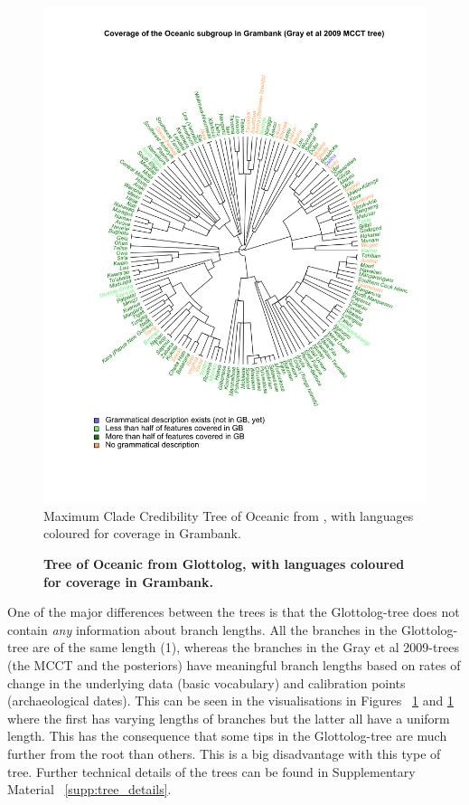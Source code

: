 \documentclass[draft,10pt]{article} %
\begin{document}
\begin{figure}[H]
\centering
\includegraphics[width=\textwidth]{illustrations/plots_from_R/coverage_plots/tree/Oceanic_tree_desc_status_gray_et_al_tree_mcct.png}
\caption{{Maximum Clade Credibility Tree of Oceanic from \citet{grayetal_2009}, with languages coloured for coverage in Grambank.}}
\label{tree_coverage_oceanic_gray}
\end{figure}

\begin{figure}[H]
\centering
\caption{\textbf{Tree of Oceanic from Glottolog, with languages coloured for coverage in Grambank.}}
\label{tree_coverage_oceanic_glottolog}
\end{figure}

One of the major differences between the trees is that the Glottolog-tree does not contain \emph{any} information about branch lengths. All the branches in the Glottolog-tree are of the same length (1), whereas the branches in the Gray et al 2009-trees (the MCCT and the posteriors) have meaningful branch lengths based on rates of change in the underlying data (basic vocabulary) and calibration points (archaeological dates). This can be seen in the visualisations in Figures ~\ref{tree_coverage_oceanic_gray} and \ref{tree_coverage_oceanic_gray} where the first has varying lengths of branches but the latter all have a uniform length. This has the consequence that some tips in the Glottolog-tree are much further from the root than others. This is a big disadvantage with this type of tree. Further technical details of the trees can be found in Supplementary Material ~\ref{supp:tree_details}.
\end{document}

